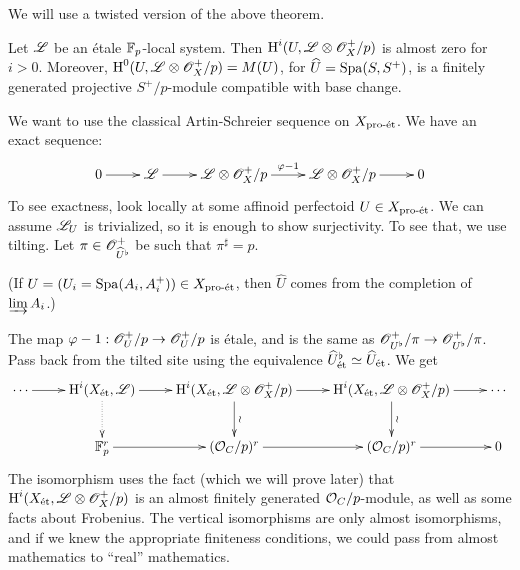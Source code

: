 We will use a twisted version of the above theorem.

\begin{theorem}
Let $\mathscr{L}$ be an \'etale $\mathbb{F}_p$-local system. Then $\operatorname{H}^i(U,\mathscr{L}\otimes \mathscr{O}_X^+/p)$ is almost 
zero for $i>0$. Moreover, $\operatorname{H}^0(U,\mathscr{L}\otimes \mathscr{O}_X^+/p) = M(U)$, for 
$\widehat U=\operatorname{Spa}(S,S^+)$, is a finitely generated projective $S^+/p$-module compatible 
with base change. 
\end{theorem}

We want to use the classical Artin-Schreier sequence on $X_{\textnormal{pro-\'et}}$. We have an 
exact sequence:
\[\xymatrix{
  0 \ar[r] 
    & \sL \ar[r] 
    & \sL\otimes \sO_X^+/p \ar[r]^-{\varphi-1} 
    & \sL\otimes \sO_X^+/p \ar[r] 
    & 0 
}\]
To see exactness, look locally at some affinoid perfectoid $U\in X_{\textnormal{pro-\'et}}$. We 
can assume $\mathscr{L}_U$ is trivialized, so it is enough to show surjectivity. To see 
that, we use tilting. Let $\pi\in \mathscr{O}_{\widehat U^\flat}^+$ be such that 
$\pi^\sharp=p$. 

(If $U=(U_i=\operatorname{Spa}(A_i,A_i^+))\in X_{\textnormal{pro-\'et}}$, then $\widehat U$ comes from the 
completion of $\varinjlim A_i$.)


The map $\varphi-1:\mathscr{O}_U^+/p \to \mathscr{O}_U^+/p$ is \'etale, and is the same as 
$\mathscr{O}_{U^\flat}^+/\pi \to \mathscr{O}_{U^\flat}^+/\pi$. Pass back from the tilted site using 
the equivalence $\widehat U_{\textnormal{\'et}}^\flat \simeq \widehat U_{\textnormal{\'et}}$. We get 
\[\xymatrix{
  \cdots \ar[r] 
    & \h^i(X_\et,\sL) \ar[r] \ar@{.>}[d] 
    & \h^i(X_\et,\sL\otimes \sO_X^+/p) \ar[r] \ar[d]^-\wr 
    & \h^i(X_\et,\sL\otimes \sO_X^+/p) \ar[r] \ar[d]^-\wr 
    & \cdots \\
  & \dF_p^r \ar[r] 
  & (\cO_C/p)^r \ar[r] 
  & (\cO_C/p)^r \ar[r] 
  & 0
}\]
The isomorphism uses the fact (which we will prove later) that 
$\operatorname{H}^i(X_{\textnormal{\'et}},\mathscr{L}\otimes \mathscr{O}_X^+/p)$ is an almost finitely generated $\mathcal{O}_C/p$-module, 
as well as some facts about Frobenius. The vertical isomorphisms are only almost 
isomorphisms, and if we knew the appropriate finiteness conditions, we could 
pass from almost mathematics to ``real'' mathematics. 

